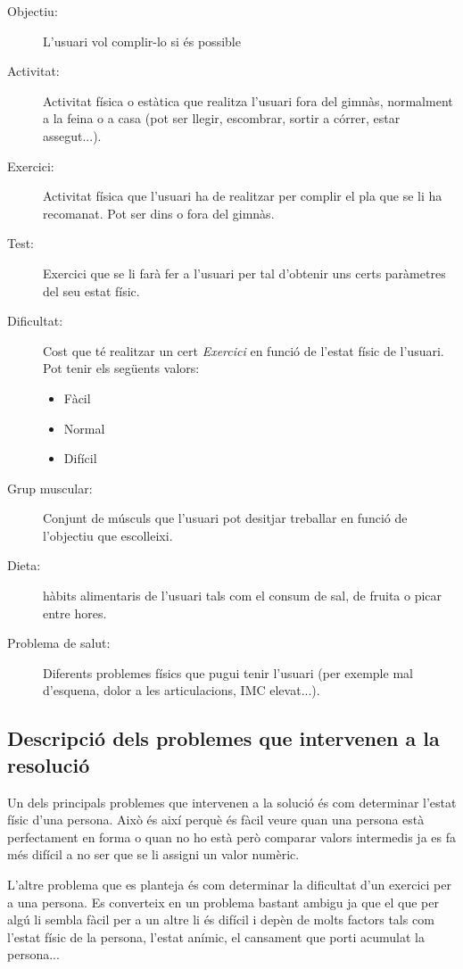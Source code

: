 \documentclass[a4paper, 12pt]{article}
\begin{document}
\begin{description}
	\item[Objectiu:]  L'usuari vol complir-lo si és possible
	\item[Activitat:] Activitat física o estàtica que realitza l'usuari fora del gimnàs, normalment a la feina o a casa (pot ser llegir, escombrar, sortir a córrer, estar assegut...).
	\item[Exercici:]  Activitat física que l'usuari ha de realitzar per complir el pla que se li ha recomanat. Pot ser dins o fora del gimnàs.
	\item[Test:] Exercici que se li farà fer a l'usuari per tal d'obtenir uns certs paràmetres del seu estat físic.
	\item[Dificultat:] Cost que té realitzar un cert \emph{Exercici} en funció de l'estat físic de l'usuari. Pot tenir els següents valors:
	\begin{itemize}
		\item Fàcil
		\item Normal
		\item Difícil
	\end{itemize}
	\item[Grup muscular:] Conjunt de músculs que l'usuari pot desitjar treballar en funció de l'objectiu que escolleixi.
	\item[Dieta:] hàbits alimentaris de l'usuari tals com el consum de sal, de fruita o picar entre hores.
	\item[Problema de salut:] Diferents problemes físics que pugui tenir l'usuari (per exemple mal d'esquena, dolor a les articulacions, IMC elevat...).
	
\end{description}

\subsection{Descripció dels problemes que intervenen a la resolució}

Un dels principals problemes que intervenen a la solució és com determinar l'estat físic d'una persona. Això és així perquè és fàcil veure quan una persona està perfectament en forma o quan no ho està però comparar valors intermedis ja es fa més difícil a no ser que se li assigni un valor numèric.

L'altre problema que es planteja és com determinar la dificultat d'un exercici per a una persona. Es converteix en un problema bastant ambigu ja que el que per algú li sembla fàcil per a un altre li és difícil i depèn de molts factors tals com l'estat físic de la persona, l'estat anímic, el cansament que porti acumulat la persona...
\end{document}
